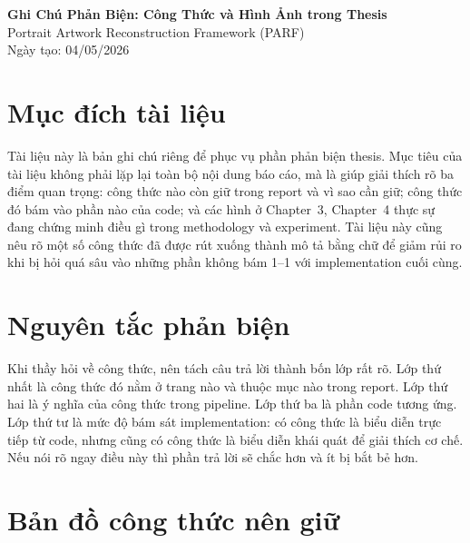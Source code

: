 \documentclass[12pt,a4paper]{article}
\begin{document}
\begin{center}
{\Large \textbf{Ghi Chú Phản Biện: Công Thức và Hình Ảnh trong Thesis}}\\[0.5em]
{\large Portrait Artwork Reconstruction Framework (PARF)}\\[0.5em]
Ngày tạo: 04/05/2026
\end{center}

\section*{Mục đích tài liệu}

Tài liệu này là bản ghi chú riêng để phục vụ phần phản biện thesis. Mục tiêu của tài liệu không phải lặp lại toàn bộ nội dung báo cáo, mà là giúp giải thích rõ ba điểm quan trọng: công thức nào còn giữ trong report và vì sao cần giữ; công thức đó bám vào phần nào của code; và các hình ở Chapter~3, Chapter~4 thực sự đang chứng minh điều gì trong methodology và experiment. Tài liệu này cũng nêu rõ một số công thức đã được rút xuống thành mô tả bằng chữ để giảm rủi ro khi bị hỏi quá sâu vào những phần không bám 1--1 với implementation cuối cùng.

\section*{Nguyên tắc phản biện}

Khi thầy hỏi về công thức, nên tách câu trả lời thành bốn lớp rất rõ. Lớp thứ nhất là công thức đó nằm ở trang nào và thuộc mục nào trong report. Lớp thứ hai là ý nghĩa của công thức trong pipeline. Lớp thứ ba là phần code tương ứng. Lớp thứ tư là mức độ bám sát implementation: có công thức là biểu diễn trực tiếp từ code, nhưng cũng có công thức là biểu diễn khái quát để giải thích cơ chế. Nếu nói rõ ngay điều này thì phần trả lời sẽ chắc hơn và ít bị bắt bẻ hơn.

\section{Bản đồ công thức nên giữ}
\end{document}

